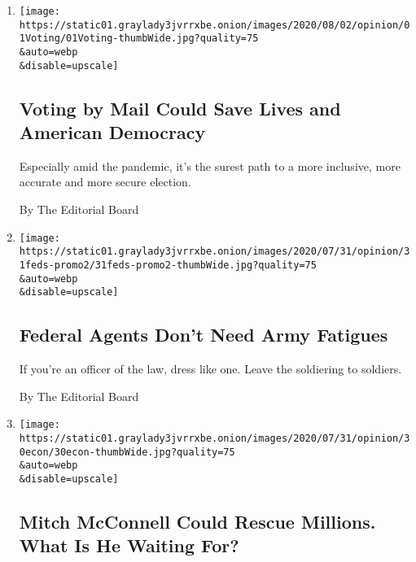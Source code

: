 \begin{enumerate}
\def\labelenumi{\arabic{enumi}.}
\item
  \href{/2020/08/01/opinion/mail-voting-covid-2020-election.html}{}

  \texttt{[image: https://static01.graylady3jvrrxbe.onion/images/2020/08/02/opinion/01Voting/01Voting-thumbWide.jpg?quality=75\\\&auto=webp\\\&disable=upscale]}

  \hypertarget{voting-by-mail-could-save-lives-and-american-democracy}{%
  \subsection{Voting by Mail Could Save Lives and American
  Democracy}\label{voting-by-mail-could-save-lives-and-american-democracy}}

  Especially amid the pandemic, it's the surest path to a more
  inclusive, more accurate and more secure election.

  By The Editorial Board
\item
  \href{/2020/07/31/opinion/federal-agents-trump-uniforms.html}{}

  \texttt{[image: https://static01.graylady3jvrrxbe.onion/images/2020/07/31/opinion/31feds-promo2/31feds-promo2-thumbWide.jpg?quality=75\\\&auto=webp\\\&disable=upscale]}

  \hypertarget{federal-agents-dont-need-army-fatigues}{%
  \subsection{Federal Agents Don't Need Army
  Fatigues}\label{federal-agents-dont-need-army-fatigues}}

  If you're an officer of the law, dress like one. Leave the soldiering
  to soldiers.

  By The Editorial Board
\item
  \href{/2020/07/30/opinion/mitch-mcconnell-coronavirus-economy.html}{}

  \texttt{[image: https://static01.graylady3jvrrxbe.onion/images/2020/07/31/opinion/30econ/30econ-thumbWide.jpg?quality=75\\\&auto=webp\\\&disable=upscale]}

  \hypertarget{mitch-mcconnell-could-rescue-millions-what-is-he-waiting-for}{%
  \subsection{Mitch McConnell Could Rescue Millions. What Is He Waiting
  For?}\label{mitch-mcconnell-could-rescue-millions-what-is-he-waiting-for}}


\end{enumerate}

